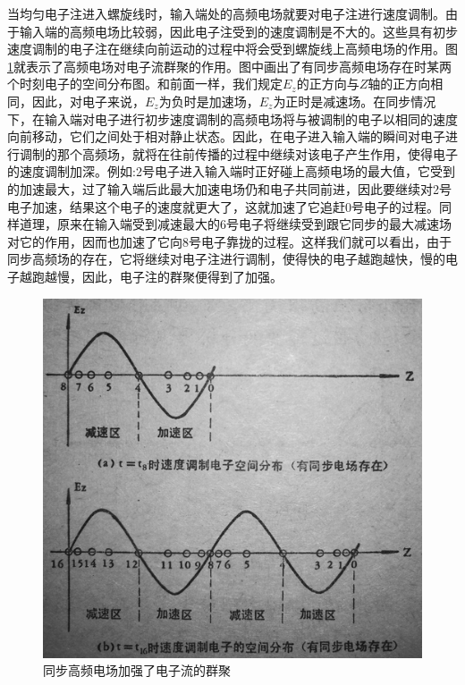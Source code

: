 当均匀电子注进入螺旋线时，输入端处的高频电场就要对电子注进行速度调制。由于输入端的高频电场比较弱，因此电子注受到的速度调制是不大的。这些具有初步速度调制的电子注在继续向前运动的过程中将会受到螺旋线上高频电场的作用。图\ref{ch2-5}就表示了高频电场对电子流群聚的作用。图中画出了有同步高频电场存在时某两个时刻电子的空间分布图。和前面一样，我们规定$ E_z $的正方向与$ Z $轴的正方向相同，因此，对电子来说，$ E_z $为负时是加速场，$ E_z $为正时是减速场。在同步情况下，在输入端对电子进行初步速度调制的高频电场将与被调制的电子以相同的速度向前移动，它们之间处于相对静止状态。因此，在电子进入输入端的瞬间对电子进行调制的那个高频场，就将在往前传播的过程中继续对该电子产生作用，使得电子的速度调制加深。例如:2号电子进入输入端时正好碰上高频电场的最大值，它受到的加速最大，过了输入端后此最大加速电场仍和电子共同前进，因此要继续对2号电子加速，结果这个电子的速度就更大了，这就加速了它追赶0号电子的过程。同样道理，原来在输入端受到减速最大的6号电子将继续受到跟它同步的最大减速场对它的作用，因而也加速了它向8号电子靠拢的过程。这样我们就可以看出，由于同步高频场的存在，它将继续对电子注进行调制，使得快的电子越跑越快，慢的电子越跑越慢，因此，电子注的群聚便得到了加强。
\begin{figure}[phtb]
	\centering
	\includegraphics[width=0.65\linewidth]{figure/ch2-5}
	\caption{同步高频电场加强了电子流的群聚}
	\label{ch2-5}
\end{figure}

